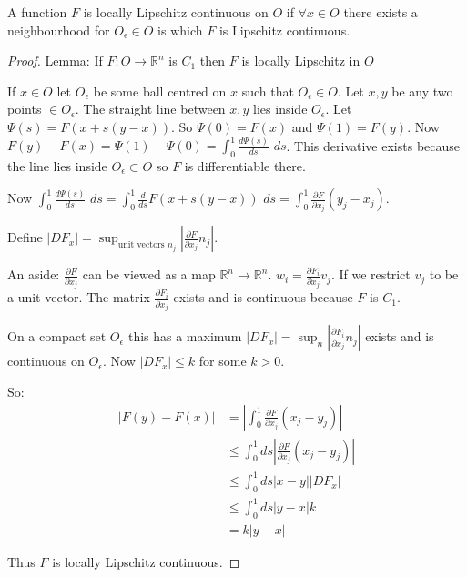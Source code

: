 A function $F$ is locally Lipschitz continuous on $O$ if $\forall x \in O$ there exists a neighbourhood for $O_{\epsilon} \in O$ is which $F$ is Lipschitz continuous.

\begin{proof}

Lemma: If $F:O\rightarrow \mathbb{R}^n$ is $C_1$ then $F$ is locally Lipschitz in $O$

If $x \in O$ let $O_{\epsilon}$ be some ball centred on $x$ such that $O_{\epsilon} \in O$. Let $x,y$ be any two points $\in O_{\epsilon}$. The straight line between $x,y$ lies inside $O_{\epsilon}$. Let $\Psi(s) = F(x+s(y-x))$. So $\Psi(0) = F(x)$ and $\Psi(1) = F(y)$. Now $F(y) - F(x) = \Psi(1) - \Psi(0) = \int_0^1 \frac{d\Psi(s)}{ds} \, \, ds$. This derivative exists because the line lies inside $O_{\epsilon} \subset O$ so $F$ is differentiable there.

Now $\int_0^1 \frac{d\Psi(s)}{ds} \, \, ds = \int_0^1 \frac{d}{ds} F(x + s(y-x)) \, \, ds = \int_0^1 \frac{\partial F}{\partial x_j} (y_j - x_j)$.

Define $|DF_x| = \sup_{\text{unit vectors $n_j$}} |\frac{\partial F}{\partial x_j} n_j|$.

An aside: $\frac{\partial F}{\partial x_j}$ can be viewed as a map $\mathbb{R}^n \rightarrow \mathbb{R}^n$. $w_i = \frac{\partial F_i}{\partial x_j} v_j$. If we restrict $v_j$ to be a unit vector. The matrix $\frac{\partial F_i}{\partial x_j}$ exists and is continuous because $F$ is $C_1$.

On a compact set $O_{\epsilon}$ this has a maximum $|DF_x| = \sup_{n} |\frac{\partial F_i}{\partial x_j} n_j|$ exists and is continuous on $O_{\epsilon}$. Now $|DF_x| \leq k$ for some $k>0$. 

So: 
\begin{align*}
|F(y) - F(x)| &= | \int_0^1 \frac{\partial F}{\partial x_j} (x_j - y_j)| \\
&\leq \int_0^1 ds | \frac{\partial F}{\partial x_j} (x_j - y_j)| \\
&\leq \int_0^1 ds |x-y| |DF_x| \\
&\leq \int_0^1 ds |y-x| k \\
&= k |y-x|
\end{align*}

Thus $F$ is locally Lipschitz continuous.

\end{proof}